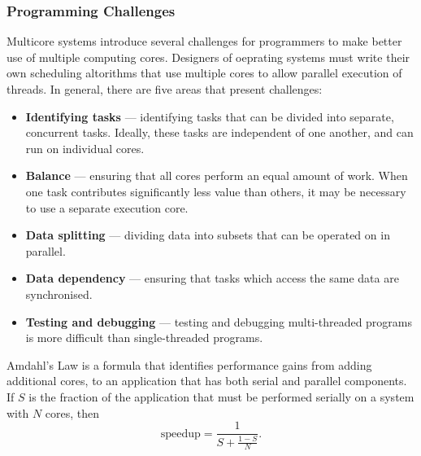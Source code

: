 \documentclass{article}
\begin{document}
\subsubsection{Programming Challenges}
Multicore systems introduce several challenges for programmers to make
better use of multiple computing cores. Designers of oeprating systems
must write their own scheduling altorithms that use multiple cores to
allow parallel execution of threads. In general, there are five areas
that present challenges:
\begin{itemize}
    \item \textbf{Identifying tasks} --- identifying tasks that can be
          divided into separate, concurrent tasks. Ideally, these tasks
          are independent of one another, and can run on individual
          cores.
    \item \textbf{Balance} --- ensuring that all cores perform an equal
          amount of work. When one task contributes significantly less
          value than others, it may be necessary to use a separate
          execution core.
    \item \textbf{Data splitting} --- dividing data into subsets that
          can be operated on in parallel.
    \item \textbf{Data dependency} --- ensuring that tasks which access
          the same data are synchronised.
    \item \textbf{Testing and debugging} --- testing and debugging
          multi-threaded programs is more difficult than single-threaded
          programs.
\end{itemize}
\begin{tcolorboxlarge}[title={Amdahl's Law}, parbox=false]
    Amdahl's Law is a formula that identifies performance gains from
    adding additional cores, to an application that has both serial
    and parallel components. If \(S\) is the fraction of the application
    that must be performed serially on a system with \(N\) cores, then
    \begin{equation*}
        \text{speedup} = \frac{1}{S + \frac{1 - S}{N}}.
    \end{equation*}
\end{tcolorboxlarge}
\end{document}
